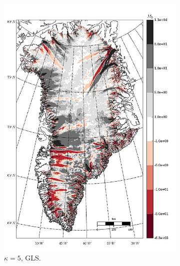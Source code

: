 \begin{figure}
  \begin{subfigure}[b]{0.25\linewidth}
    \includegraphics[width=\linewidth]{images/balance_velocity/greenland/d_U_ob/misfit_5H_kappa_5_GLS.jpg}
  \caption{$\kappa = 5$, GLS.}
  \label{greenland_bv_image_d_U_ob_kappa_5_GLS_misfit}
  \end{subfigure}
  \begin{subfigure}[b]{0.25\linewidth}

\end{subfigure}
\end{figure}
